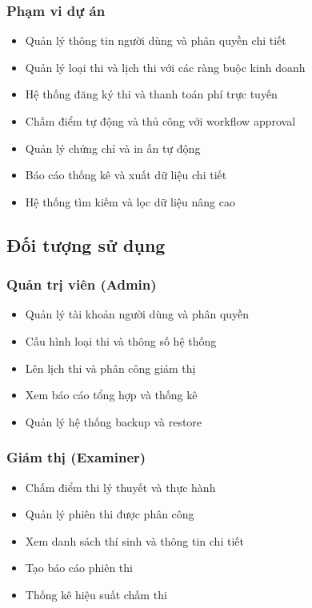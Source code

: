 \documentclass[12pt,a4paper]{article}
\begin{document}
\subsubsection{Phạm vi dự án}
\begin{itemize}
    \item Quản lý thông tin người dùng và phân quyền chi tiết
    \item Quản lý loại thi và lịch thi với các ràng buộc kinh doanh
    \item Hệ thống đăng ký thi và thanh toán phí trực tuyến
    \item Chấm điểm tự động và thủ công với workflow approval
    \item Quản lý chứng chỉ và in ấn tự động
    \item Báo cáo thống kê và xuất dữ liệu chi tiết
    \item Hệ thống tìm kiếm và lọc dữ liệu nâng cao
\end{itemize}

\subsection{Đối tượng sử dụng}

\subsubsection{Quản trị viên (Admin)}
\begin{itemize}
    \item Quản lý tài khoản người dùng và phân quyền
    \item Cấu hình loại thi và thông số hệ thống
    \item Lên lịch thi và phân công giám thị
    \item Xem báo cáo tổng hợp và thống kê
    \item Quản lý hệ thống backup và restore
\end{itemize}

\subsubsection{Giám thị (Examiner)}
\begin{itemize}
    \item Chấm điểm thi lý thuyết và thực hành
    \item Quản lý phiên thi được phân công
    \item Xem danh sách thí sinh và thông tin chi tiết
    \item Tạo báo cáo phiên thi
    \item Thống kê hiệu suất chấm thi
\end{itemize}
\end{document}
